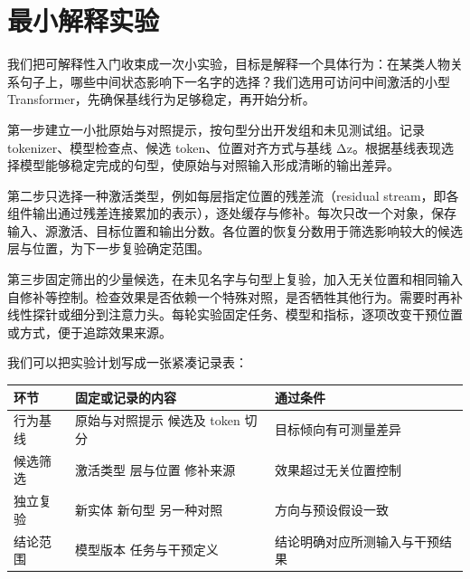 \section{最小解释实验}\label{最小解释实验}

我们把可解释性入门收束成一次小实验，目标是解释一个具体行为：在某类人物关系句子上，哪些中间状态影响下一名字的选择？我们选用可访问中间激活的小型 Transformer，先确保基线行为足够稳定，再开始分析。

第一步建立一小批原始与对照提示，按句型分出开发组和未见测试组。记录 tokenizer、模型检查点、候选 token、位置对齐方式与基线 Δz。根据基线表现选择模型能够稳定完成的句型，使原始与对照输入形成清晰的输出差异。

第二步只选择一种激活类型，例如每层指定位置的残差流（residual stream，即各组件输出通过残差连接累加的表示），逐处缓存与修补。每次只改一个对象，保存输入、源激活、目标位置和输出分数。各位置的恢复分数用于筛选影响较大的候选层与位置，为下一步复验确定范围。

第三步固定筛出的少量候选，在未见名字与句型上复验，加入无关位置和相同输入自修补等控制。检查效果是否依赖一个特殊对照，是否牺牲其他行为。需要时再补线性探针或细分到注意力头。每轮实验固定任务、模型和指标，逐项改变干预位置或方式，便于追踪效果来源。

我们可以把实验计划写成一张紧凑记录表：

\begin{longtable}[]{@{}
  >{\raggedright\arraybackslash}p{}
  >{\raggedright\arraybackslash}p{}
  >{\raggedright\arraybackslash}p{}@{}}
\toprule\noalign{}
\begin{minipage}[b]{\linewidth}\raggedright
\textbf{环节}
\end{minipage} & \begin{minipage}[b]{\linewidth}\raggedright
\textbf{固定或记录的内容}
\end{minipage} & \begin{minipage}[b]{\linewidth}\raggedright
\textbf{通过条件}
\end{minipage} \\
\midrule\noalign{}
\endhead
\bottomrule\noalign{}
\endlastfoot
行为基线 & 原始与对照提示 候选及 token 切分 & 目标倾向有可测量差异 \\
候选筛选 & 激活类型 层与位置 修补来源 & 效果超过无关位置控制 \\
独立复验 & 新实体 新句型 另一种对照 & 方向与预设假设一致 \\
结论范围 & 模型版本 任务与干预定义 & 结论明确对应所测输入与干预结果 \\
\end{longtable}

